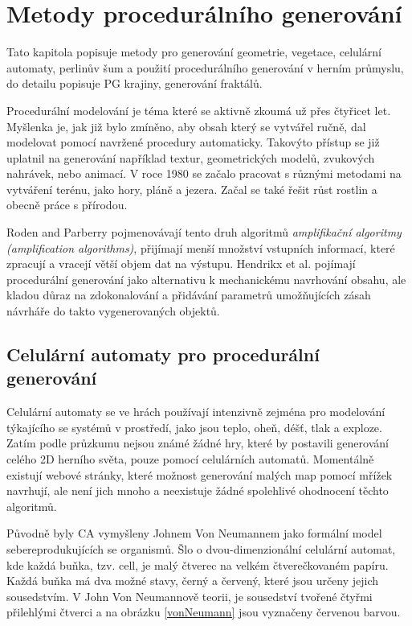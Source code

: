 \chapter{Metody procedurálního generování}
\label{procedural}
Tato kapitola popisuje metody pro generování geometrie, vegetace, celulární automaty, perlinův šum a použití procedurálního generování v herním průmyslu, do detailu popisuje PG krajiny, generování fraktálů.

Procedurální modelování je téma které se aktivně zkoumá už přes čtyřicet let. Myšlenka je, jak již bylo zmíněno, aby obsah který se vytvářel ručně, dal modelovat pomocí navržené procedury automaticky. Takovýto přístup se již uplatnil na generování například textur, geometrických modelů, zvukových nahrávek, nebo animací. V roce 1980 se začalo pracovat s různými metodami na vytváření terénu, jako hory, pláně a jezera. Začal se také řešit růst rostlin a obecně práce s přírodou. \cite{inproceedings}

Roden and Parberry \cite{FromArtistry} pojmenovávají tento druh algoritmů \textit{amplifikační algoritmy (amplification algorithms)}, přijímají menší množství vstupních informací, které zpracují a vracejí větší objem dat na výstupu. Hendrikx et al. \cite{Hendrikx} pojímají procedurální generování jako alternativu k mechanickému navrhování obsahu, ale kladou důraz na zdokonalování a přidávání parametrů umožňujících zásah návrháře do takto vygenerovaných objektů.

\section{Celulární automaty pro procedurální generování}
\label{celular}
Celulární automaty se ve hrách používají intenzivně zejména pro modelování týkajícího se systémů v prostředí, jako jsou teplo, oheň, déšť, tlak a exploze. Zatím podle průzkumu nejsou známé žádné hry, které by postavili generování celého 2D herního světa, pouze pomocí celulárních automatů. Momentálně existují webové stránky, které možnost generování malých map pomocí mřížek navrhují, ale není jich mnoho a neexistuje žádné spolehlivé ohodnocení těchto algoritmů. \cite{articleCellular}

Původně byly CA vymyšleny Johnem Von Neumannem jako formální model sebereprodukujících se organismů. Šlo o dvou-dimenzionální celulární automat, kde každá buňka, tzv. cell, je malý čtverec na velkém čtverečkovaném papíru. Každá buňka má dva možné stavy, černý a červený, které jsou určeny jejich sousedstvím. V John Von Neumannově teorii, je sousedství tvořené čtyřmi přilehlými čtverci a na obrázku \ref{vonNeumann} jsou vyznačeny červenou barvou. \cite{Gong2017}

